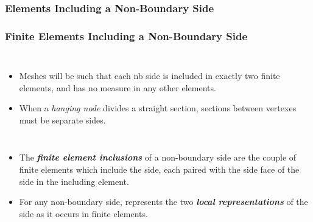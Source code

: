 \documentclass[compress]{beamer}
\begin{document}
\subsubsection{Elements Including a Non-Boundary Side}

\begin{frame}
  \frametitle{Finite Elements Including a Non-Boundary Side}
  \begin{columns}
      \begin{itemize}[<+->]
        \item Meshes will be such that each nb side is included in exactly two finite elements,
          and has no measure in any other elements.
        \item When a \emph{hanging node} divides a straight section, sections between vertexes must be separate sides.
      \end{itemize}
     {
      } {
         {}
                 {}
      }
  \end{columns}
  \begin{itemize}[<+->]
    \item The \emph{\textbf{finite element inclusions}} of a non-boundary side are the couple of finite elements which include the side,
      each paired with the side face of the side in the including element.
    \item For any non-boundary side, represents the two \emph{\textbf{local representations}} of the side as it occurs in finite elements.
  \end{itemize}
\end{frame}
\end{document}
